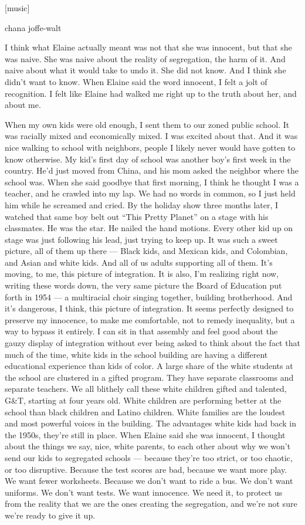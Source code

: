 {[}music{]}

chana joffe-walt

I think what Elaine actually meant was not that she was innocent, but
that she was naive. She was naive about the reality of segregation, the
harm of it. And naive about what it would take to undo it. She did not
know. And I think she didn't want to know. When Elaine said the word
innocent, I felt a jolt of recognition. I felt like Elaine had walked me
right up to the truth about her, and about me.

When my own kids were old enough, I sent them to our zoned public
school. It was racially mixed and economically mixed. I was excited
about that. And it was nice walking to school with neighbors, people I
likely never would have gotten to know otherwise. My kid's first day of
school was another boy's first week in the country. He'd just moved from
China, and his mom asked the neighbor where the school was. When she
said goodbye that first morning, I think he thought I was a teacher, and
he crawled into my lap. We had no words in common, so I just held him
while he screamed and cried. By the holiday show three months later, I
watched that same boy belt out ``This Pretty Planet'' on a stage with
his classmates. He was the star. He nailed the hand motions. Every other
kid up on stage was just following his lead, just trying to keep up. It
was such a sweet picture, all of them up there --- Black kids, and
Mexican kids, and Colombian, and Asian and white kids. And all of us
adults supporting all of them. It's moving, to me, this picture of
integration. It is also, I'm realizing right now, writing these words
down, the very same picture the Board of Education put forth in 1954 ---
a multiracial choir singing together, building brotherhood. And it's
dangerous, I think, this picture of integration. It seems perfectly
designed to preserve my innocence, to make me comfortable, not to remedy
inequality, but a way to bypass it entirely. I can sit in that assembly
and feel good about the gauzy display of integration without ever being
asked to think about the fact that much of the time, white kids in the
school building are having a different educational experience than kids
of color. A large share of the white students at the school are
clustered in a gifted program. They have separate classrooms and
separate teachers. We all blithely call these white children gifted and
talented, G\&T, starting at four years old. White children are
performing better at the school than black children and Latino children.
White families are the loudest and most powerful voices in the building.
The advantages white kids had back in the 1950s, they're still in place.
When Elaine said she was innocent, I thought about the things we say,
nice, white parents, to each other about why we won't send our kids to
segregated schools --- because they're too strict, or too chaotic, or
too disruptive. Because the test scores are bad, because we want more
play. We want fewer worksheets. Because we don't want to ride a bus. We
don't want uniforms. We don't want tests. We want innocence. We need it,
to protect us from the reality that we are the ones creating the
segregation, and we're not sure we're ready to give it up.

